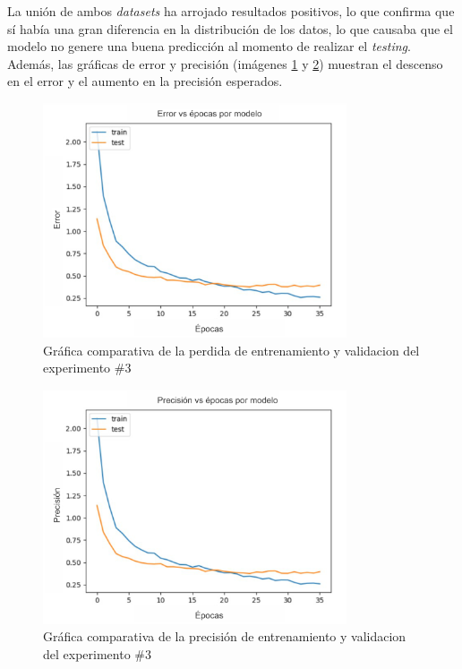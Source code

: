 La unión de ambos \textit{datasets} ha arrojado resultados positivos, lo que confirma que sí había una gran diferencia en la distribución de los datos, lo que causaba que el modelo no genere una buena predicción al momento de realizar el \textit{testing}. Además, las gráficas de error y precisión (imágenes \ref{fig:losses5} y \ref{fig:accuracy5}) muestran el descenso en el error y el aumento en la precisión esperados.

\begin{figure}[h!]
\centering
\includegraphics[width=0.8\textwidth]{images/loss5.png}
\caption{Gráfica comparativa de la perdida de entrenamiento y validacion del experimento \#3}
\label{fig:losses5}
\end{figure}

\begin{figure}[h!]
\centering
\includegraphics[width=0.8\textwidth]{images/accuracy5.png}
\caption{Gráfica comparativa de la precisión de entrenamiento y validacion del experimento \#3}
\label{fig:accuracy5}
\end{figure}

